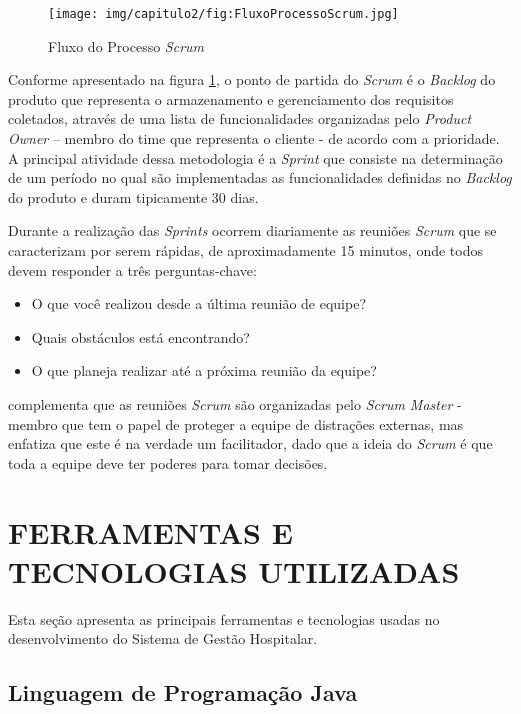 \begin{figure}[H]
    \centering
     \caption{Fluxo do Processo \textit{Scrum}}
    \texttt{[image: img/capitulo2/fig:FluxoProcessoScrum.jpg]}
    \label{fig:FluxoProcessoScrum}
\end{figure}


Conforme apresentado na figura \ref{fig:FluxoProcessoScrum}, o ponto de partida do \textit{Scrum} é o \textit{Backlog} do produto que representa o armazenamento e gerenciamento dos requisitos coletados, através de uma lista de funcionalidades organizadas pelo \textit{Product Owner} – membro do time que representa o cliente - de acordo com a prioridade. A principal atividade dessa metodologia é a \textit{Sprint} que consiste na determinação de um período no qual são implementadas as funcionalidades definidas no \textit{Backlog} do produto e duram tipicamente 30 dias.\cite{pressman2011engenharia}

Durante a realização das \textit{Sprints} ocorrem diariamente as reuniões \textit{Scrum} que se caracterizam por serem rápidas, de aproximadamente 15 minutos, onde todos devem responder a três perguntas-chave:

\begin{itemize}
    \item O que você realizou desde a última reunião de equipe?
    \item Quais obstáculos está encontrando?
    \item O que planeja realizar até a próxima reunião da equipe? \cite{pressman2011engenharia}
\end{itemize} 

 complementa que as reuniões \textit{Scrum} são organizadas pelo \textit{Scrum Master} - membro que tem o papel de proteger a equipe de distrações externas, mas enfatiza que este é na verdade um facilitador, dado que a ideia do \textit{Scrum} é que toda a equipe deve ter poderes para tomar decisões.


\section{FERRAMENTAS E TECNOLOGIAS UTILIZADAS}
Esta seção apresenta as principais ferramentas e tecnologias usadas no desenvolvimento do Sistema de Gestão Hospitalar.

\subsection{\textbf{Linguagem de Programação Java}}

